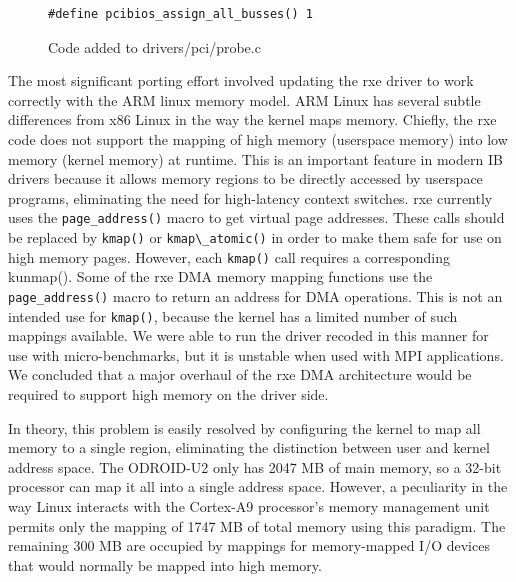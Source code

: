 \documentclass[a4paper]{article}
\begin{document}
\begin{figure}[h]
\begin{verbatim}
#define pcibios_assign_all_busses() 1
\end{verbatim}
\caption{Code added to drivers/pci/probe.c}
\label{pci_code}
\end{figure}

The most significant porting effort involved updating the rxe driver to work
correctly with the ARM linux memory model. ARM Linux has several subtle
differences from x86 Linux in the way the kernel maps memory. Chiefly, the rxe
code does not support the mapping of high memory (userspace memory) into low
memory (kernel memory) at runtime. This is an important feature in modern IB
drivers because it allows memory regions to be directly accessed by userspace
programs, eliminating the need for high-latency context switches. rxe currently
uses the \verb;page_address(); macro to get virtual page addresses. These calls
should be replaced by \verb;kmap(); or \verb;kmap\_atomic(); in order to make
them safe for use on high memory pages. However, each \verb;kmap(); call
requires a corresponding kunmap(). Some of the rxe DMA memory mapping functions
use the \verb;page_address(); macro to return an address for DMA
operations. This is not an intended use for \verb;kmap();, because the kernel
has a limited number of such mappings available. We were able to run the driver
recoded in this manner for use with micro-benchmarks, but it is unstable when
used with MPI applications. We concluded that a major overhaul of the rxe DMA
architecture would be required to support high memory on the driver side.

In theory, this problem is easily resolved by configuring the kernel to map all
memory to a single region, eliminating the distinction between user and kernel
address space. The ODROID-U2 only has 2047 MB of main memory, so a 32-bit
processor can map it all into a single address space. However, a peculiarity in
the way Linux interacts with the Cortex-A9 processor's memory management unit
permits only the mapping of 1747 MB of total memory using this paradigm. The
remaining 300 MB are occupied by mappings for memory-mapped I/O devices that
would normally be mapped into high memory.

\end{document}
